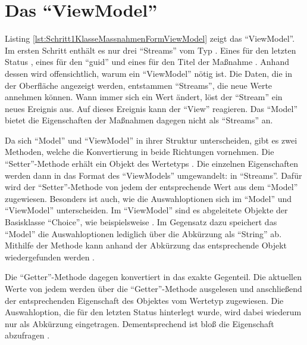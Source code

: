

\ifodd\value{page}\hbox{}\newpage\fi
\section{Das \enquote{ViewModel}}
\label{sec:ViewModel}

Listing \ref{lst:Schritt1KlasseMassnahmenFormViewModel} zeigt das \enquote{ViewModel}.
Im ersten Schritt enthält es nur drei \enquote{Streams} vom Typ .
Eines für den letzten Status , eines für den \enquote{guid}  und eines für den Titel der Maßnahme .
Anhand dessen wird offensichtlich, warum ein \enquote{ViewModel} nötig ist.
Die Daten, die in der Oberfläche angezeigt werden, entstammen \enquote{Streams}, die neue Werte annehmen können.
Wann immer sich ein Wert ändert, löst der \enquote{Stream} ein neues Ereignis aus.
Auf dieses Ereignis kann der \enquote{View} reagieren.
Das \enquote{Model} bietet die Eigenschaften der Maßnahmen dagegen nicht als \enquote{Streams} an.

Da sich \enquote{Model} und \enquote{ViewModel} in ihrer Struktur unterscheiden, gibt es zwei Methoden, welche die Konvertierung in beide Richtungen vornehmen.
Die \enquote{Setter}-Methode   erhält ein Objekt des Wertetyps .
Die einzelnen Eigenschaften werden dann in das Format des \enquote{ViewModels} umgewandelt: in \enquote{Streams}.
Dafür wird der \enquote{Setter}-Methode  von jedem  der entsprechende Wert aus dem \enquote{Model} zugewiesen. 
Besonders ist auch, wie die Auswahloptionen sich im \enquote{Model} und \enquote{ViewModel} unterscheiden.
Im \enquote{ViewModel} sind es abgeleitete Objekte der Basisklasse \enquote{Choice}, wie beispielsweise  .  
Im Gegensatz dazu speichert das \enquote{Model} die Auswahloptionen lediglich über die Abkürzung als \enquote{String} ab.
Mithilfe der Methode  kann anhand der Abkürzung das entsprechende Objekt wiedergefunden werden .

Die \enquote{Getter}-Methode   dagegen konvertiert in das exakte Gegenteil.
Die aktuellen Werte von jedem  werden über die \enquote{Getter}-Methode  ausgelesen und anschließend der entsprechenden Eigenschaft des Objektes vom Wertetyp  zugewiesen.
Die Auswahloption, die für den letzten Status hinterlegt wurde, wird dabei wiederum nur als Abkürzung eingetragen.
Dementsprechend ist bloß die Eigenschaft  abzufragen .

